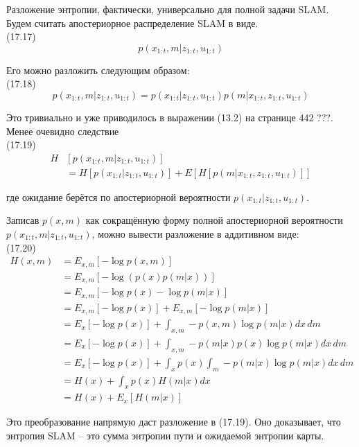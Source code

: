 \documentclass[10pt,a4paper]{article}
\begin{document}
Разложение энтропии, фактически, универсально для полной задачи SLAM. Будем считать апостериорное распределение SLAM в виде.\\

(17.17)
$$p(x_{1:t},m|z_{1:t},u_{1:t})$$

Его можно разложить следующим образом:\\

(17.18)
$$p(x_{1:t},m|z_{1:t},u_{1:t})=p(x_{1:t}|z_{1:t},u_{1:t})p(m|x_{1:t},z_{1:t},u_{1:t})$$

Это тривиально и уже приводилось в выражении (13.2) на странице 442 ???. Менее очевидно следствие\\

(17.19)
\begin{equation*}
\begin{split}
H&[p(x_{1:t},m|z_{1:t},u_{1:t})]\\
&=H[p(x_{1:t}|z_{1:t},u_{1:t})]+E[H[p(m|x_{1:t},z_{1:t},u_{1:t})]]
\end{split}
\end{equation*}

где ожидание берётся по апостериорной вероятности $p(x_{1:t}|z_{1:t},u_{1:t})$.

Записав   $p(x, m)$  как сокращённую форму полной апостериорной вероятности  $p(x_{1:t},m|z_{1:t},u_{1:t})$, можно вывести разложение в аддитивном виде:\\

(17.20)
\begin{equation*}
\begin{split}
H(x,m)&=E_{x,m}[-\log p(x,m)]\\
&=E_{x,m}[-\log (p(x)p(m|x))]\\
&=E_{x,m}[-\log p(x)-\log p(m|x)]\\
&=E_{x,m}[-\log p(x)]+E_{x,m}[-\log p(m|x)]\\
&=E_x[-\log p(x)]+\int_{x,m}-p(x,m)\log p(m|x)dx\,dm\\
&=E_x[-\log p(x)]+\int_{x,m}-p(m|x)p(x)\log p(m|x)dx\,dm\\
&=E_x[-\log p(x)]+\int_xp(x)\int_m-p(m|x)\log p(m|x)dx\,dm\\
&=H(x)+\int_xp(x)H(m|x)dx\\
&=H(x)+E_x[H(m|x)]
\end{split}
\end{equation*}

Это преобразование напрямую даст разложение в (17.19). Оно доказывает, что энтропия SLAM – это сумма энтропии пути и ожидаемой энтропии карты.\\
\end{document}

